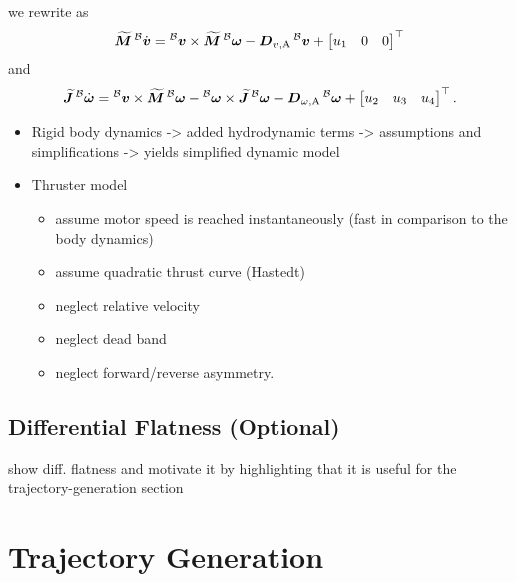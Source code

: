 we rewrite  as
\begin{equation}
	\label{eq:eom-translational-with-input}
	\mbox{$\widetilde{\bm{M}}$} \prescript{\mathcal{B}}{}{\mbox{$\dot{\bm{v}}$}} =
	\prescript{\mathcal{B}}{}{\mbox{$\bm{v}$}} \times \mbox{$\widetilde{\bm{M}}$} \prescript{\mathcal{B}}{}{\mbox{$\bm{\omega}$}}
	-\mbox{$\bm{D}$}_{v,\text{A}} \prescript{\mathcal{B}}{}{\mbox{$\bm{v}$}}
	+
	\begin{bmatrix}
		u_1 & 0 & 0
	\end{bmatrix}^\top
\end{equation}
and
\begin{equation}
	\label{eq:eom-rotational-with-input}
	\mbox{$\widetilde{\bm{J}}$} \prescript{\mathcal{B}}{}{\mbox{$\dot{\bm{\omega}}$}} =
	\prescript{\mathcal{B}}{}{\mbox{$\bm{v}$}} \times \mbox{$\widetilde{\bm{M}}$} \prescript{\mathcal{B}}{}{\mbox{$\bm{\omega}$}}
	- \prescript{\mathcal{B}}{}{\mbox{$\bm{\omega}$}} \times \mbox{$\widetilde{\bm{J}}$} \prescript{\mathcal{B}}{}{\mbox{$\bm{\omega}$}}
	- \mbox{$\bm{D}$}_{\omega,\text{A}} \prescript{\mathcal{B}}{}{\mbox{$\bm{\omega}$}}
	+
	\begin{bmatrix}
		u_2 & u_3 & u_4
	\end{bmatrix}^\top
	.
\end{equation}

\begin{itemize}
	\color{red}
	\item Rigid body dynamics -> added hydrodynamic terms -> assumptions and simplifications -> yields simplified dynamic model
	\item Thruster model
	\begin{itemize}
		\item assume motor speed is reached instantaneously (fast in comparison to the body dynamics)
		\item assume quadratic thrust curve (Hastedt)
		\item neglect relative velocity
		\item neglect dead band
		\item neglect forward/reverse asymmetry.
	\end{itemize}
\end{itemize}

\subsection{Differential Flatness (Optional)}
{\color{red}
	show diff. flatness and motivate it by highlighting that it is useful for the trajectory-generation section
}

\section{Trajectory Generation}
\label{sec:trajectory-generation}

